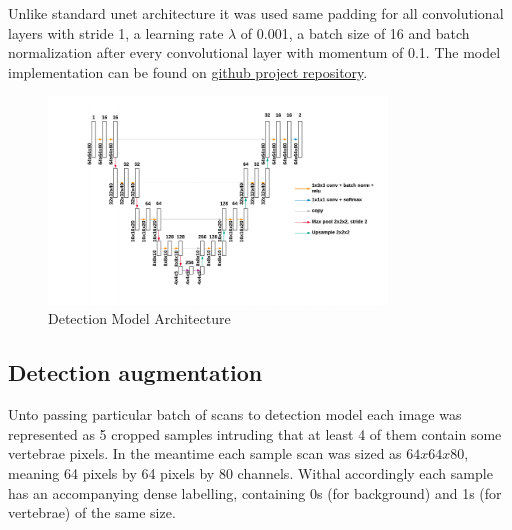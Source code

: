 Unlike standard unet architecture it was used same padding for all convolutional layers with stride 1, a learning rate
$\lambda$ of 0.001, a batch size of 16 and batch normalization after every convolutional layer with momentum of 0.1. The model implementation can be found on \href{https://github.com/KumundzhievMaxim/VertebraeSegmentation/blob/main/train_detection_model.py}{\color{blue} github project repository}. 

\begin{figure}[h]
    \centering \includegraphics[width=9cm]{images/detection_model.png}
    \caption {Detection Model Architecture}
    \label{fig:detection_model}
\end{figure}
 
\subsection{Detection augmentation}
Unto passing particular batch of scans to detection model each image was represented as 5 cropped samples intruding that at least 4 of them contain some vertebrae pixels. In the meantime each sample scan was sized as $64x64x80$, meaning 64 pixels by 64 pixels by 80 channels. Withal accordingly each sample has an accompanying dense labelling, containing 0s (for background) and 1s (for vertebrae) of the same size.    
 
